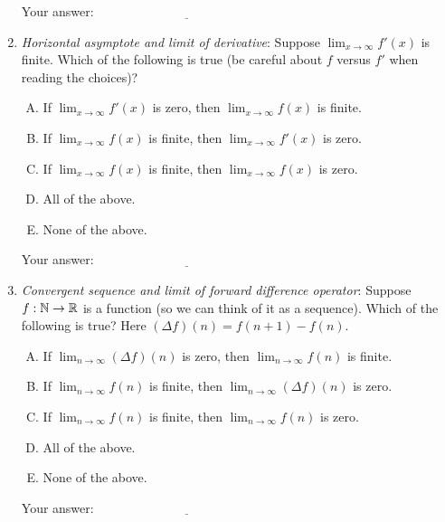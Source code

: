 \documentclass[10pt]{amsart}
\begin{document}
\begin{enumerate}
  \vspace{0.1in}
  Your answer: $\underline{\qquad\qquad\qquad\qquad\qquad\qquad\qquad}$
  \vspace{0.15in}

\item {\em Horizontal asymptote and limit of derivative}: Suppose
  $\lim_{x \to \infty} f'(x)$ is finite. Which of the following is
  true (be careful about $f$ versus $f'$ when reading the choices)?
  \begin{enumerate}[(A)]
  \item If $\lim_{x \to \infty} f'(x)$ is zero, then $\lim_{x \to
    \infty} f(x)$ is finite.
  \item If $\lim_{x \to \infty} f(x)$ is finite, then $\lim_{x \to
    \infty} f'(x)$ is zero.
  \item If $\lim_{x \to \infty} f(x)$ is finite, then $\lim_{x \to
    \infty} f(x)$ is zero.
  \item All of the above.
  \item None of the above.
  \end{enumerate}

  \vspace{0.1in}
  Your answer: $\underline{\qquad\qquad\qquad\qquad\qquad\qquad\qquad}$
  \vspace{0.15in}

\item {\em Convergent sequence and limit of forward difference
  operator}: Suppose $f: \mathbb{N} \to \mathbb{R}$ is a function (so we can think of
  it as a sequence). Which of the following is true? Here $(\Delta
  f)(n) =f(n+1) - f(n)$.

  \begin{enumerate}[(A)]
  \item If $\lim_{n \to \infty} (\Delta f)(n)$ is zero, then $\lim_{n \to
    \infty} f(n)$ is finite.
  \item If $\lim_{n \to \infty} f(n)$ is finite, then $\lim_{n \to
    \infty} (\Delta f)(n)$ is zero.
  \item If $\lim_{n \to \infty} f(n)$ is finite, then $\lim_{n \to
    \infty} f(n)$ is zero.
  \item All of the above.
  \item None of the above.
  \end{enumerate}

  \vspace{0.1in}
  Your answer: $\underline{\qquad\qquad\qquad\qquad\qquad\qquad\qquad}$
  \vspace{0.15in}


\end{enumerate}
\end{document}
